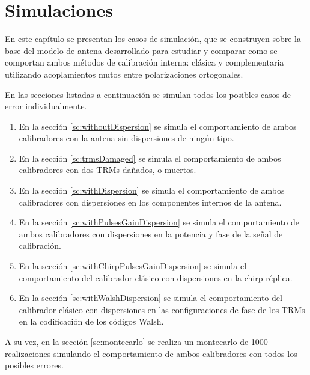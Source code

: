 \chapter{Simulaciones}
\label{ch:simulations}


En este capítulo se presentan los casos de simulación, que se construyen sobre la base del modelo de antena desarrollado para
estudiar y comparar como se comportan ambos métodos de calibración interna: clásica y complementaria utilizando acoplamientos
mutos entre polarizaciones ortogonales.

En las secciones listadas a continuación se simulan todos los posibles casos de error individualmente.
\begin{enumerate}
	\item En la sección \ref{sc:withoutDispersion} se simula el comportamiento de ambos calibradores con la antena sin
		dispersiones de ningún tipo.
	\item En la sección \ref{sc:trmsDamaged} se simula el comportamiento de ambos calibradores con dos TRMs dañados, o muertos.
	\item En la sección \ref{sc:withDispersion} se simula el comportamiento de ambos calibradores con dispersiones en los
		componentes internos de la antena.
	\item En la sección \ref{sc:withPulsesGainDispersion} se simula el comportamiento de ambos calibradores con dispersiones en
		la potencia y fase de la señal de calibración.
	\item En la sección \ref{sc:withChirpPulsesGainDispersion} se simula el comportamiento del calibrador clásico con 
		dispersiones en la chirp réplica. 
	\item En la sección \ref{sc:withWalshDispersion} se simula el comportamiento del calibrador clásico con dispersiones en las
		configuraciones de fase de los TRMs en la codificación de los códigos Walsh.
\end{enumerate}

A su vez, en la sección \ref{sc:montecarlo} se realiza un montecarlo de 1000 realizaciones simulando el comportamiento de ambos
calibradores con todos los posibles errores. 

